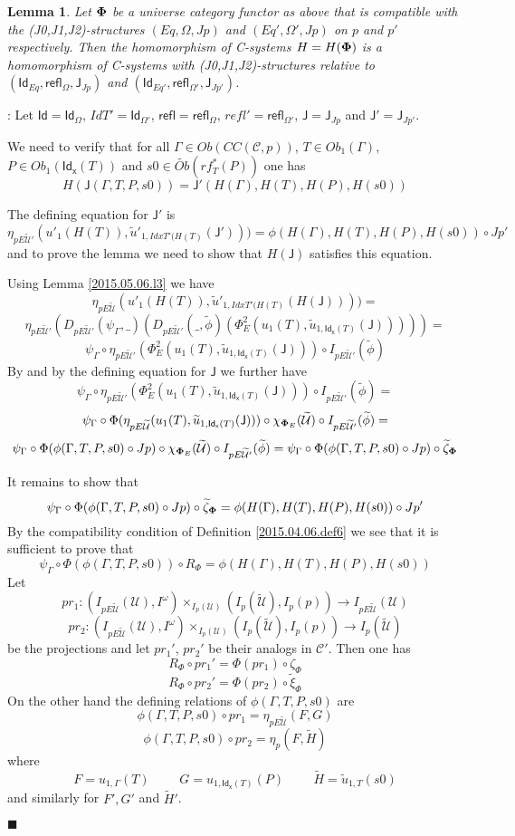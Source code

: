 \documentclass[12pt]{article}
\numberwithin{equation}{section}
\newenvironment{myproof}{{\bf Proof}:}{$\blacksquare$ \vskip 5mm }
\newtheorem{lemma}[proposition]{Lemma}
\newcommand{\llabel}[1]{\label{#1}}
\newcommand{\sr}{\rightarrow}
\newcommand{\wt}{\widetilde}
\newcommand{\spc}{{\,\,\,\,\,\,\,}}
\newcommand{\toCC}{CC} %
\newcommand{\Id}{\mathsf{Id}} %
\newcommand{\refl}{\mathsf{refl}}
\newcommand{\J}{\mathsf{J}}
\newcommand{\Idx}{\mathsf{Id_x}} %
\newcommand{\U}{\mathcal{U}}
\begin{document}
\begin{lemma}
\llabel{2015.04.12.l3} Let ${\bf\Phi}$ be a universe category functor as above
that is compatible with the (J0,J1,J2)-structures $(Eq,\Omega,Jp)$ and
$(Eq',\Omega',Jp)$ on $p$ and $p'$ respectively. Then the homomorphism of
C-systems $H=H({\bf\Phi})$ is a homomorphism of C-systems with
(J0,J1,J2)-structures relative to $(\Id_{Eq},\refl_{\Omega},\J_{Jp})$ and
$(\Id_{Eq'},\refl_{\Omega'},\J_{Jp'})$.
\end{lemma}
%
\begin{myproof}
Let $\Id=\Id_{\Omega}$, $IdT'=\Id_{\Omega'}$, $\refl=\refl_{\Omega}$,
$refl'=\refl_{\Omega'}$, $\J=\J_{Jp}$ and $\J'=\J_{Jp'}$.

We need to verify that for all $\Gamma\in Ob(\toCC({\mathcal C},p))$, $T\in
Ob_1(\Gamma)$, $P\in Ob_1(\Idx(T))$ and $s0\in \wt{Ob}(rf^*_T(P))$ one has
%
$$H(\J(\Gamma,T,P,s0))=\J'(H(\Gamma),H(T),H(P),H(s0))$$
%

The defining equation for $\J'$ is
%
$$\eta_{pE\wt{\U}'}(u'_1(H(T)),\wt{u}'_{1,{IdxT'(H(T)}}(\J')))=\phi(H(\Gamma),H(T),H(P),H(s0))\circ
Jp'$$
%
and to prove the lemma we need to show that $H(\J)$ satisfies this equation.

Using Lemma \ref{2015.05.06.l3} we have
%
$$\eta_{pE\wt{\U}}(u'_1(H(T)),\wt{u}'_{1,{IdxT'(H(T)}}(H(\J))))=$$$$\eta_{pE\wt{\U}'}(D_{pE\wt{\U}'}(\psi_{\Gamma},\_)(D_{pE\wt{\U}'}(\_,\wt{\phi})(\Phi_E^2(u_1(T),\wt{u}_{1,\Idx(T)}(\J)))))=$$
$$\psi_{\Gamma}\circ
\eta_{pE\wt{\U}'}(\Phi_E^2(u_1(T),\wt{u}_{1,\Idx(T)}(\J)))\circ
I_{pE\wt{\U}'}(\wt{\phi})$$
%
By \cite[Lemma 5.8]{fromunivwithPi} and by the defining equation for $\J$ we
further have
%
$$\psi_{\Gamma}\circ
\eta_{pE\wt{\U}'}(\Phi_E^2(u_1(T),\wt{u}_{1,\Idx(T)}(\J)))\circ
I_{pE\wt{\U}'}(\wt{\phi})=$$$$\psi_{\Gamma}\circ
\Phi(\eta_{pE\wt{\U}}(u_1(T),\wt{u}_{1,\Idx(T)}(\J)))\circ
\chi_{{\bf\Phi}_E}(\wt{\U})\circ I_{pE\wt{\U}'}(\wt{\phi})=$$
$$\psi_{\Gamma}\circ \Phi(\phi(\Gamma,T,P,s0)\circ Jp)\circ
\chi_{{\bf\Phi}_E}(\wt{\U})\circ I_{pE\wt{\U}'}(\wt{\phi})=\psi_{\Gamma}\circ
\Phi(\phi(\Gamma,T,P,s0)\circ Jp)\circ \wt{\zeta}_{\bf\Phi}$$
%

It remains to show that
%
$$\psi_{\Gamma}\circ \Phi(\phi(\Gamma,T,P,s0)\circ Jp)\circ
\wt{\zeta}_{\bf\Phi}=\phi(H(\Gamma),H(T),H(P),H(s0))\circ Jp'$$
%
By the compatibility condition of Definition \ref{2015.04.06.def6} we see that
it is sufficient to prove that
%
$$\psi_{\Gamma}\circ \Phi(\phi(\Gamma,T,P,s0))\circ R_{\Phi} =
\phi(H(\Gamma),H(T),H(P),H(s0))$$
%
Let
%
$$pr_1:(I_{pE\wt{\U}}(\U),I^{\omega})\times_{I_{p}(\U)}(I_{p}(\wt{\U}),I_p(p))\sr
I_{pE\wt{\U}}(\U)$$
$$pr_2:(I_{pE\wt{\U}}(\U),I^{\omega})\times_{I_{p}(\U)}(I_{p}(\wt{\U}),I_p(p))\sr
I_{p}(\wt{\U})$$
%
be the projections and let $pr_1'$, $pr_2'$ be their analogs in $\mathcal
C'$. Then one has
%
$$R_{\Phi}\circ pr_1'=\Phi(pr_1)\circ \zeta_{\Phi}$$
$$R_{\Phi}\circ pr_2'=\Phi(pr_2)\circ \wt{\xi}_{\Phi}$$
%
On the other hand the defining relations of $\phi(\Gamma,T,P,s0)$ are
%
$$\phi(\Gamma,T,P,s0)\circ pr_1=\eta_{pE\wt{\U}}(F,G)$$
$$\phi(\Gamma,T,P,s0)\circ pr_2=\eta_p(F,\wt{H})$$
%
where
%
$$F=u_{1,\Gamma}(T)\spc\spc G=u_{1,\Idx(T)}(P)\spc\spc
\wt{H}=\wt{u}_{1,T}(s0)$$
%
and similarly for $F',G'$ and $\wt{H}'$.


\end{myproof}
\end{document}
